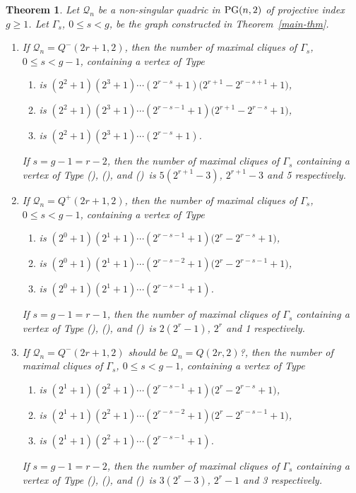 \documentclass[12pt]{article}
\newtheorem{theorem}{Theorem}[section]
\newcommand{\Q}{\mathscr Q}
\newcommand\PG{{\rm PG}}
\newcommand{\Label}{\label}
\newcommand\red[1]{{\color{red} #1}}
\newcommand\tone{{\rm (\romannumeral 1)}}
\newcommand\ttwo{{\rm (\romannumeral 2)}}
\newcommand\tthree{{\rm (\romannumeral 3)}}
\begin{document}
\begin{theorem}\Label{thm-max-cliq-thru-pt}
 Let $\Q_n$ be a non-singular quadric in $\PG(n,2)$ of projective index $g\geq1$. Let $\Gamma_s$, $0\leq s<g$,
 be the graph constructed in Theorem~\ref{main-thm}.
\begin{enumerate}
\item If $\Q_n=Q^-(2r+1,2)$, then the number of maximal cliques of $\Gamma_s$, \red{  $0\leq s<g-1$}, containing a vertex of Type
\begin{enumerate}
\item[{\rm (i)}] is  $(2^2+1)(2^3+1)\cdots(2^{r-s}+1)\big(2^{r+1}-2^{r-s+1}+1\big)$,
\item[{\rm (ii)}] is  $(2^2+1)(2^3+1)\cdots(2^{r-s-1}+1)\big(2^{r+1}-2^{r-s}+1\big)$,
\item[{\rm (iii)}] is  $(2^2+1)(2^3+1)\cdots(2^{r-s}+1)$.
\end{enumerate}
\red{If $s=g-1=r-2$, then  the number of maximal cliques of $\Gamma_s$ containing a vertex of Type \tone, \ttwo, and \tthree\ is  $5(2^{r+1}-3)$, $2^{r+1}-3$ and 5 respectively. }\item If $\Q_n=Q^+(2r+1,2)$, then the number of maximal cliques of $\Gamma_s$, $0\leq s<g-1$, containing a vertex of Type
\begin{enumerate}
\item[{\rm (i)}] is  $(2^0+1)(2^1+1)\cdots(2^{r-s-1}+1)\big(2^{r}-2^{r-s}+1\big)$,
\item[{\rm (ii)}] is  $(2^0+1)(2^1+1)\cdots(2^{r-s-2}+1)\big(2^{r}-2^{r-s-1}+1\big)$,
\item[{\rm (iii)}] is   $(2^0+1)(2^1+1)\cdots(2^{r-s-1}+1)$.
\end{enumerate}
If $s=g-1=r-1$, then  the number of maximal cliques of $\Gamma_s$ containing a vertex of Type \tone, \ttwo, and \tthree\ is 
 $2(2^r-1)$, $2^r$ and 1 respectively. 
\item If $\Q_n=Q^-(2r+1,2)$ \red{should be  $\Q_n=Q(2r,2)$?}, then the number of maximal cliques of $\Gamma_s$, \red{  $0\leq s<g-1$}, containing a vertex of Type
\begin{enumerate}
\item[{\rm (i)}] is  $(2^1+1)(2^2+1)\cdots(2^{r-s-1}+1)\big(2^{r}-2^{r-s}+1\big)$,
\item[{\rm (ii)}] is  $(2^1+1)(2^2+1)\cdots(2^{r-s-2}+1)\big(2^{r}-2^{r-s-1}+1\big)$,
\item[{\rm (iii)}] is  $(2^1+1)(2^2+1)\cdots(2^{r-s-1}+1)$.
\end{enumerate}
\red{If $s=g-1=r-2$, then  the number of maximal cliques of $\Gamma_s$ containing a vertex of Type \tone, \ttwo, and \tthree\ is  $3(2^r-3)$, $2^r-1$ and 3 respectively. }
\end{enumerate}
\end{theorem}
\end{document}
